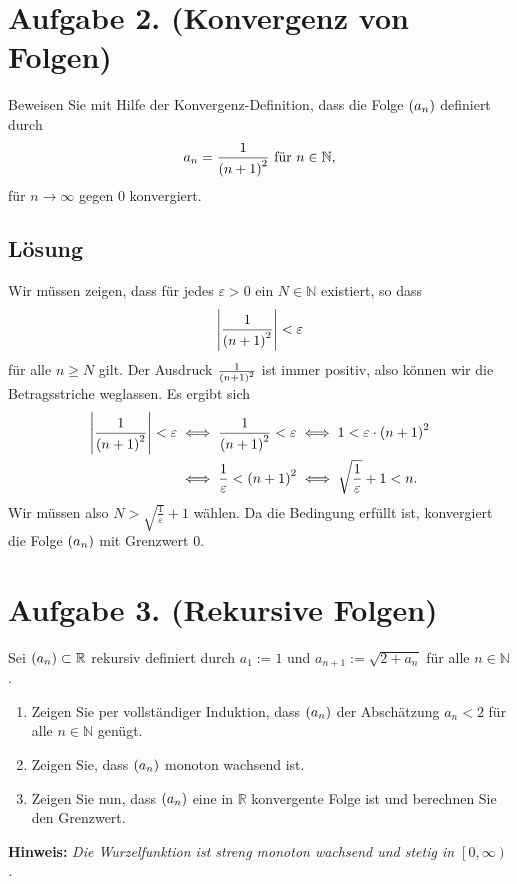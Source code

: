 \documentclass[german,12pt]{homework}
\newcommand{\NN}{\mathbb{N}}
\newcommand{\RR}{\mathbb{R}}
\DeclarePairedDelimiter{\absolute}{\lvert}{\rvert}
\DeclarePairedDelimiter{\enbrace}{(}{)}
\begin{document}
    \section*{Aufgabe 2. (Konvergenz von Folgen)}

    \begin{problem}
        Beweisen Sie mit Hilfe der Konvergenz-Definition, dass die Folge \(\enbrace*{a_n}\) definiert durch
        \[a_n = \frac{1}{\enbrace*{n + 1}^2}\text{ für }n \in \NN,\]
        für \(n \to \infty\) gegen \(0\) konvergiert.
    \end{problem}

    \subsection*{Lösung} Wir müssen zeigen, dass für jedes \(\varepsilon > 0\) ein \(N \in \NN\) existiert, so dass
    \[\absolute*{\frac{1}{\enbrace*{n + 1}^2}} < \varepsilon\]
    für alle \(n \ge N\) gilt. Der Ausdruck \(\frac{1}{\enbrace*{n + 1}^2}\) ist immer positiv, also können wir die Betragsstriche weglassen. Es ergibt sich
    \begin{align*}
        \absolute*{\frac{1}{\enbrace*{n + 1}^2}} < \varepsilon &\iff \frac{1}{\enbrace*{n + 1}^2} < \varepsilon \iff 1 < \varepsilon \cdot \enbrace*{n + 1}^2\\
        &\iff \frac{1}{\varepsilon} < \enbrace*{n + 1}^2 \iff \sqrt{\frac{1}{\varepsilon}} + 1 < n.
    \end{align*}
    Wir müssen also \(N > \sqrt{\frac{1}{\varepsilon}} + 1\) wählen. Da die Bedingung erfüllt ist, konvergiert die Folge \(\enbrace*{a_n}\) mit Grenzwert \(0\).

    \section*{Aufgabe 3. (Rekursive Folgen)}

    \begin{problem}
        Sei \(\enbrace*{a_n} \subset \RR\) rekursiv definiert durch \(a_1 := 1\) und \(a_{n + 1} := \sqrt{2 + a_n}\) für alle \(n \in \NN\).
        \begin{enumerate}
            \item Zeigen Sie per vollständiger Induktion, dass \(\enbrace*{a_n}\) der Abschätzung \(a_n < 2\) für alle \(n \in \NN\) genügt.
            \item Zeigen Sie, dass \(\enbrace*{a_n}\) monoton wachsend ist.
            \item Zeigen Sie nun, dass \(\enbrace*{a_n}\) eine in \(\RR\) konvergente Folge ist und berechnen Sie den Grenzwert.
        \end{enumerate}

        \textbf{Hinweis:} \quad \emph{Die Wurzelfunktion ist streng monoton wachsend und stetig in \(\left[0, \infty\right)\).}
    \end{problem}
\end{document}

